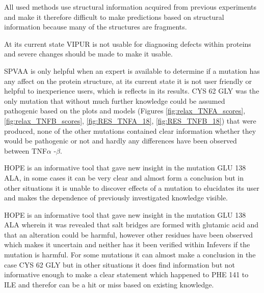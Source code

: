 All used methods use structural information acquired from previous experiments and make it therefore difficult to make predictions based on structural information because many of the structures are fragments.

At its current state VIPUR is not usable for diagnosing defects within proteins and severe changes should be made to make it usable. 

SPVAA is only helpful when an expert is available to determine if a mutation has any affect on the protein structure,  at its current state it is not user friendly or helpful to inexperience users, which is reflects in its results. CYS 62 GLY was the only mutation that without much further knowledge could be assumed pathogenic based on the plots and models (Figures \ref{fig:relax_TNFA_scores}, \ref{fig:relax_TNFB_scores}, \ref{fig:RES_TNFA_18}, \ref{fig:RES_TNFB_18}) that were produced, none of the other mutations contained clear information whether they would be pathogenic or not and hardly any differences have been observed between TNF$\alpha$ -$\beta$. 

HOPE is an informative tool that gave new insight in the mutation GLU 138 ALA, in some cases it can be very clear and almost form a conclusion but in other situations it is unable to discover effects of a mutation to elucidates its user and makes the dependence of previously investigated knowledge visible.

HOPE is an informative tool that gave new insight in the mutation GLU 138 ALA wherein it was revealed that salt bridges are formed with glutamic acid and that an alteration could be harmful, however other residues have been observed which makes it uncertain and neither has it been verified within Infevers if the mutation is harmful. For some mutations it can almost make a conclusion in the case CYS 62 GLY but in other situations it does find information but not informative enough to make a clear statement which happened to PHE 141 to ILE and therefor can be a hit or miss based on existing knowledge.
